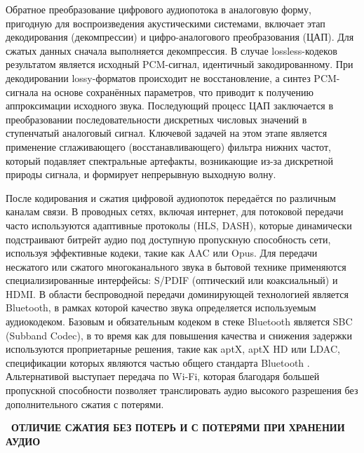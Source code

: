 \documentclass{SibFU-docs}
\begin{document}

Обратное преобразование цифрового аудиопотока в аналоговую форму, пригодную для воспроизведения акустическими системами, включает этап декодирования (декомпрессии) и цифро-аналогового преобразования (ЦАП). Для сжатых данных сначала выполняется декомпрессия. В случае lossless-кодеков результатом является исходный PCM-сигнал, идентичный закодированному. При декодировании lossy-форматов происходит не восстановление, а синтез PCM-сигнала на основе сохранённых параметров, что приводит к получению аппроксимации исходного звука. Последующий процесс ЦАП заключается в преобразовании последовательности дискретных числовых значений в ступенчатый аналоговый сигнал. Ключевой задачей на этом этапе является применение сглаживающего (восстанавливающего) фильтра нижних частот, который подавляет спектральные артефакты, возникающие из-за дискретной природы сигнала, и формирует непрерывную выходную волну.


После кодирования и сжатия цифровой аудиопоток передаётся по различным каналам связи. В проводных сетях, включая интернет, для потоковой передачи часто используются адаптивные протоколы (HLS, DASH), которые динамически подстраивают битрейт аудио под доступную пропускную способность сети, используя эффективные кодеки, такие как AAC или Opus. Для передачи несжатого или сжатого многоканального звука в бытовой технике применяются специализированные интерфейсы: S/PDIF (оптический или коаксиальный) и HDMI. В области беспроводной передачи доминирующей технологией является Bluetooth, в рамках которой качество звука определяется используемым аудиокодеком. Базовым и обязательным кодеком в стеке Bluetooth является SBC (Subband Codec), в то время как для повышения качества и снижения задержки используются проприетарные решения, такие как aptX, aptX HD или LDAC, спецификации которых являются частью общего стандарта Bluetooth \cite{bluetooth2024}. Альтернативой выступает передача по Wi-Fi, которая благодаря большей пропускной способности позволяет транслировать аудио высокого разрешения без дополнительного сжатия с потерями.

\newpage
{}
\begin{center}\textbf{\thesection\ ОТЛИЧИЕ СЖАТИЯ БЕЗ ПОТЕРЬ И С ПОТЕРЯМИ ПРИ ХРАНЕНИИ АУДИО}\end{center}
\vspace*{-1.5em}
\end{document}
